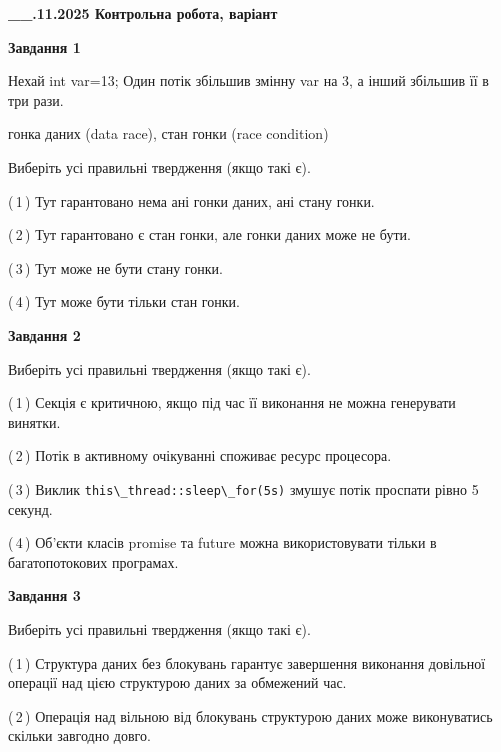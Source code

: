 \documentclass[12pt, ukrainian]{article}
\def\code#1{\Verb!#1!}
\begin{document}
\begin {large}

\textbf{\_\_.11.2025 Контрольна робота, варіант  }\par


{

\begin{center}
\textbf{Завдання 1}
\end{center}
Нехай int var=13; Один потік збільшив змінну var на 3, а інший збільшив її в три рази.

гонка даних (data race), стан гонки (race condition)

Виберіть усі правильні твердження (якщо такі є).\par
\vspace{2mm}
(\,1\,) Тут гарантовано нема ані гонки даних, ані стану гонки.%

(\,2\,) Тут гарантовано є стан гонки, але гонки даних може не бути.%

(\,3\,) Тут може не бути стану гонки.%

(\,4\,) Тут може бути тільки стан гонки.%



\begin{center}
\textbf{Завдання 2}
\end{center}
Виберіть усі правильні твердження (якщо такі є).\par
\vspace{2mm}

(\,1\,) Секція є критичною, якщо під час її виконання не можна генерувати винятки.%

(\,2\,) Потік в активному очікуванні споживає ресурс процесора.%

(\,3\,) Виклик \code{this\_thread::sleep\_for(5s)} змушує потік проспати рівно 5 секунд.%

(\,4\,) Об’єкти класів promise та future можна використовувати тільки в багатопотокових програмах.%



\begin{center}
\textbf{Завдання 3}
\end{center}
Виберіть усі правильні твердження (якщо такі є).\par
\vspace{2mm}

(\,1\,) Структура даних без блокувань гарантує завершення виконання довільної операції над цією структурою даних за обмежений час.%

(\,2\,) Операція над вільною від блокувань структурою даних може виконуватись скільки завгодно довго.%

}
\end{large}
\end{document}
